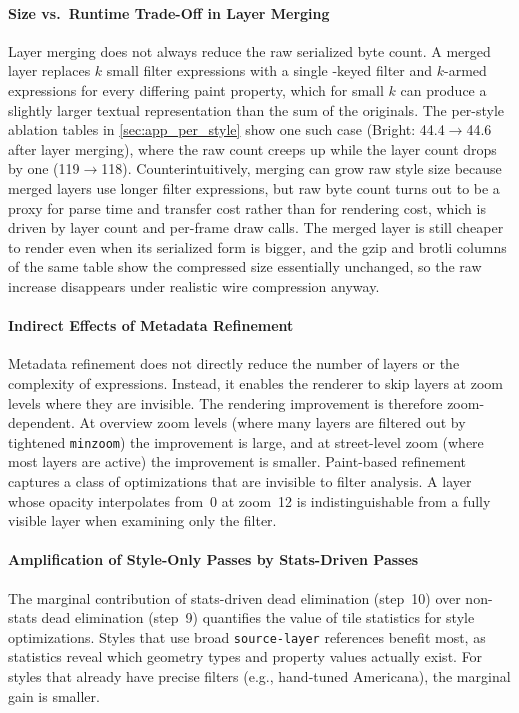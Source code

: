 \paragraph{Size vs.\ Runtime Trade-Off in Layer Merging}
Layer merging does not always reduce the raw serialized byte count.
A merged layer replaces $k$ small filter expressions with a single -keyed filter and $k$-armed  expressions for every differing paint property, which for small $k$ can produce a slightly larger textual representation than the sum of the originals.
The per-style ablation tables in \cref{sec:app_per_style} show one such case (Bright: \num{44.4}$\to$\qty{44.6}{\kilo\byte} after layer merging), where the raw count creeps up while the layer count drops by one (119$\to$118).
Counterintuitively, merging can grow raw style size because merged layers use longer filter expressions, but raw byte count turns out to be a proxy for parse time and transfer cost rather than for rendering cost, which is driven by layer count and per-frame draw calls.
The merged layer is still cheaper to render even when its serialized form is bigger, and the gzip and brotli columns of the same table show the compressed size essentially unchanged, so the raw increase disappears under realistic wire compression anyway.

\paragraph{Indirect Effects of Metadata Refinement}
Metadata refinement does not directly reduce the number of layers or the complexity of expressions.
Instead, it enables the renderer to skip layers at zoom levels where they are invisible.
The rendering improvement is therefore zoom-dependent.
At overview zoom levels (where many layers are filtered out by tightened \texttt{minzoom}) the improvement is large, and at street-level zoom (where most layers are active) the improvement is smaller.
Paint-based refinement captures a class of optimizations that are invisible to filter analysis.
A layer whose opacity interpolates from~0 at zoom~12 is indistinguishable from a fully visible layer when examining only the filter.

\paragraph{Amplification of Style-Only Passes by Stats-Driven Passes}
The marginal contribution of stats-driven dead elimination (step~10) over non-stats dead elimination (step~9) quantifies the value of tile statistics for style optimizations.
Styles that use broad \texttt{source-layer} references benefit most, as statistics reveal which geometry types and property values actually exist.
For styles that already have precise filters (e.g., hand-tuned Americana), the marginal gain is smaller.

